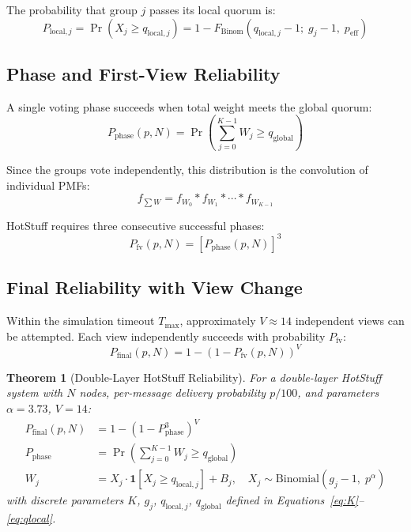 \documentclass[
12pt,
oneside,
singlespacing,
parskip,
]{article}
\newtheorem{theorem}{Theorem}[section]
\begin{document}
The probability that group $j$ passes its local quorum is:
\begin{equation}
  P_{\mathrm{local},j} = \Pr(X_j \geq q_{\mathrm{local},j}) = 1 - F_\mathrm{Binom}(q_{\mathrm{local},j} - 1;\; g_j - 1,\; p_\mathrm{eff})
  \label{eq:Plocal}
\end{equation}

\subsection{Phase and First-View Reliability}

A single voting phase succeeds when total weight meets the global quorum:
\begin{equation}
  P_\mathrm{phase}(p, N) = \Pr\!\left(\sum_{j=0}^{K-1} W_j \geq q_\mathrm{global}\right)
  \label{eq:Pphase}
\end{equation}

Since the groups vote independently, this distribution is the convolution of individual PMFs:
\begin{equation}
  f_{\sum W} = f_{W_0} * f_{W_1} * \cdots * f_{W_{K-1}}
  \label{eq:conv}
\end{equation}

HotStuff requires three consecutive successful phases:
\begin{equation}
  P_\mathrm{fv}(p, N) = \left[P_\mathrm{phase}(p, N)\right]^3
  \label{eq:Pfv}
\end{equation}

\subsection{Final Reliability with View Change}

Within the simulation timeout $T_\mathrm{max}$, approximately $V \approx 14$ independent views can be attempted. Each view independently succeeds with probability $P_\mathrm{fv}$:
\begin{equation}
  P_\mathrm{final}(p, N) = 1 - \left(1 - P_\mathrm{fv}(p, N)\right)^V
  \label{eq:Pfinal}
\end{equation}

\begin{theorem}[Double-Layer HotStuff Reliability]
\label{thm:main}
For a double-layer HotStuff system with $N$ nodes, per-message delivery probability $p/100$, and parameters $\alpha = 3.73$, $V = 14$:
\begin{align}
  P_\mathrm{final}(p, N) &= 1 - \left(1 - P_\mathrm{phase}^3\right)^V \nonumber \\
  P_\mathrm{phase} &= \Pr\!\left(\sum_{j=0}^{K-1} W_j \geq q_\mathrm{global}\right) \nonumber \\
  W_j &= X_j \cdot \mathbf{1}[X_j \geq q_{\mathrm{local},j}] + B_j, \quad
  X_j \sim \mathrm{Binomial}(g_j - 1,\; p^{\alpha}) \nonumber
\end{align}
with discrete parameters $K$, $g_j$, $q_{\mathrm{local},j}$, $q_\mathrm{global}$ defined in Equations~\eqref{eq:K}--\eqref{eq:qlocal}.
\end{theorem}
\end{document}
